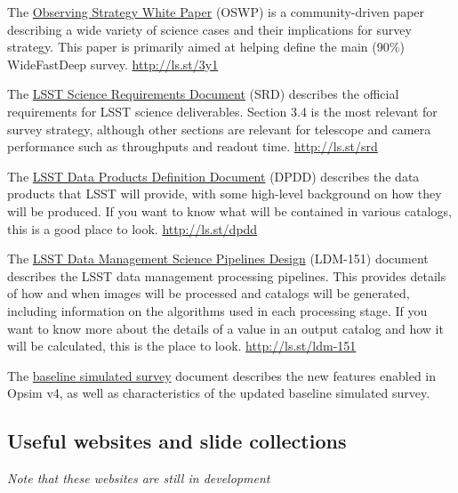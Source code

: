 \documentclass[DM,lsstdraft,toc,usenatbib]{lsstdoc}
\begin{document}
The \href{https://github.com/LSSTScienceCollaborations/ObservingStrategy}{Observing Strategy White Paper}  (OSWP) is a community-driven paper describing a wide variety of science cases and their implications for survey strategy. This paper is primarily aimed at helping define the main (90\%) WideFastDeep survey. \url{http://ls.st/3y1}

The \href{http:/ls.st/srd}{LSST Science Requirements Document} (SRD) describes the official requirements for LSST science deliverables. Section 3.4 is the most relevant for survey strategy, although other sections are relevant for telescope and camera performance such as throughputs and readout time. \url{http://ls.st/srd}

The \href{http://ls.st/dpdd}{LSST Data Products Definition Document} (DPDD) describes the data products that LSST will provide, with some high-level background on how they will be produced. If you want to know what will be contained in various catalogs, this is a good place to look. \url{http://ls.st/dpdd}

The \href{http://ls.st/ldm-151}{LSST Data Management Science Pipelines Design} (LDM-151) document describes the LSST data management processing pipelines. This provides details of how and when images will be processed and catalogs will be generated, including information on the algorithms used in each processing stage. If you want to know more about the details of a value in an output catalog and how it will be calculated, this is the place to look. \url{http://ls.st/ldm-151}


The \href{https://github.com/lsst-pst/survey_strategy/blob/master/db/baseline-doc/baseline.pdf}{baseline simulated survey} document describes the new features enabled in Opsim v4, as well as characteristics of the updated baseline simulated survey. 

\subsection{Useful websites and slide collections}

{\it Note that these websites are still in development}
\end{document}
